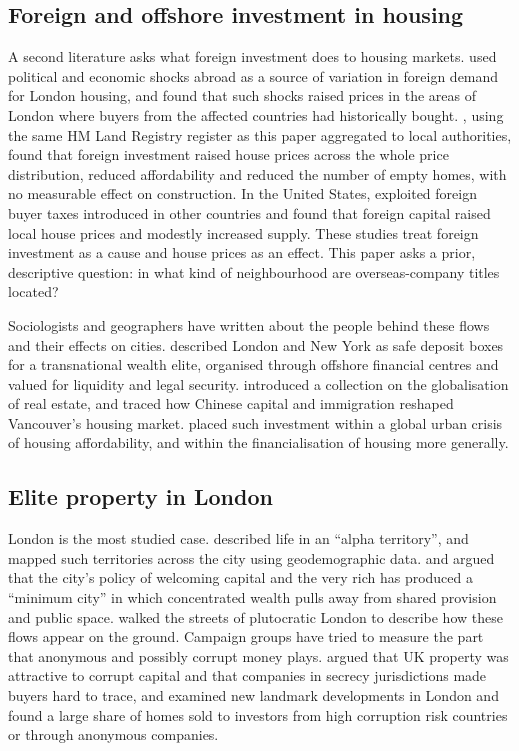 \documentclass[11pt,a4paper]{article}
\begin{document}
\subsection{Foreign and offshore investment in housing}
A second literature asks what foreign investment does to housing markets. \citet{badarinza2018} used political and economic shocks abroad as a source of variation in foreign demand for London housing, and found that such shocks raised prices in the areas of London where buyers from the affected countries had historically bought. \citet{sa2025}, using the same HM Land Registry register as this paper aggregated to local authorities, found that foreign investment raised house prices across the whole price distribution, reduced affordability and reduced the number of empty homes, with no measurable effect on construction. In the United States, \citet{gorback2020} exploited foreign buyer taxes introduced in other countries and found that foreign capital raised local house prices and modestly increased supply. These studies treat foreign investment as a cause and house prices as an effect. This paper asks a prior, descriptive question: in what kind of neighbourhood are overseas-company titles located?

Sociologists and geographers have written about the people behind these flows and their effects on cities. \citet{fernandez2016} described London and New York as safe deposit boxes for a transnational wealth elite, organised through offshore financial centres and valued for liquidity and legal security. \citet{rogers2017} introduced a collection on the globalisation of real estate, and \citet{ley2017} traced how Chinese capital and immigration reshaped Vancouver's housing market. \citet{wetzstein2017} placed such investment within a global urban crisis of housing affordability, and \citet{aalbers2016} within the financialisation of housing more generally.

\subsection{Elite property in London}
London is the most studied case. \citet{webber2016} described life in an ``alpha territory'', and \citet{burrows2017} mapped such territories across the city using geodemographic data. \citet{atkinson2017} and \citet{atkinson2020} argued that the city's policy of welcoming capital and the very rich has produced a ``minimum city'' in which concentrated wealth pulls away from shared provision and public space. \citet{knowles2022} walked the streets of plutocratic London to describe how these flows appear on the ground. Campaign groups have tried to measure the part that anonymous and possibly corrupt money plays. \citet{tiuk2015} argued that UK property was attractive to corrupt capital and that companies in secrecy jurisdictions made buyers hard to trace, and \citet{tiuk2017} examined new landmark developments in London and found a large share of homes sold to investors from high corruption risk countries or through anonymous companies.
\end{document}
